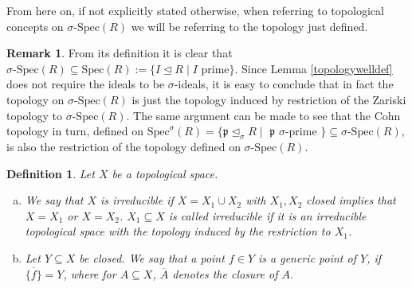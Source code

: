 \documentclass{article}
\def\p{\mathfrak{p}}
\def\s{\sigma}
\def\si{\unlhd_{\sigma}}
\def\Spec{\text{Spec}}
\def\sSpec{\sigma\text{-Spec}}
\theoremstyle{plain}
\newtheorem{defn}[Satz]{Definition}
\theoremstyle{definition}
\newtheorem{rem}[Satz]{Remark}
\begin{document}
From here on, if not explicitly stated otherwise, when referring to topological concepts on $\sSpec(R)$ we will be referring to the topology just defined.

\begin{rem}
From its definition it is clear that $\sSpec(R) \subseteq \Spec(R):= \{ I \unlhd R \mid I \text{ prime} \}$. Since Lemma \ref{topologywelldef} does not require the ideals to be $\s$-ideals, 
it is easy to conclude that in fact the topology on $\sSpec(R)$ is just the topology induced by restriction of the Zariski topology to $\sSpec(R)$. The same argument can be made to see that the Cohn topology in turn,
defined on $\Spec^\s(R) = \{ \p \si R \mid $ $\p$ $ \s$-prime $\} \subseteq \sSpec(R)$, is also the restriction of the topology defined on $\sSpec(R)$. 
\end{rem}

\begin{defn}
Let $X$ be a topological space.
\begin{enumerate}[(a)]
\item  We say that $X$ is \emph{irreducible} if $X = X_1 \cup X_2$ with $X_1, X_2$ closed implies that $X = X_1$ or $X = X_2$. 
$X_1 \subseteq X$ is called \emph{irreducible} if it is an irreducible topological space with the topology induced by the restriction to $X_1$.
\item Let $Y \subseteq X$ be closed. We say that a point $f \in Y$ is a \emph{generic point} of $Y$, if $\overline{\{  f \} } = Y$, where for $A \subseteq X$, $\overline{A}$ denotes the closure of $A$. 
\end{enumerate}
\end{defn}
\end{document}
